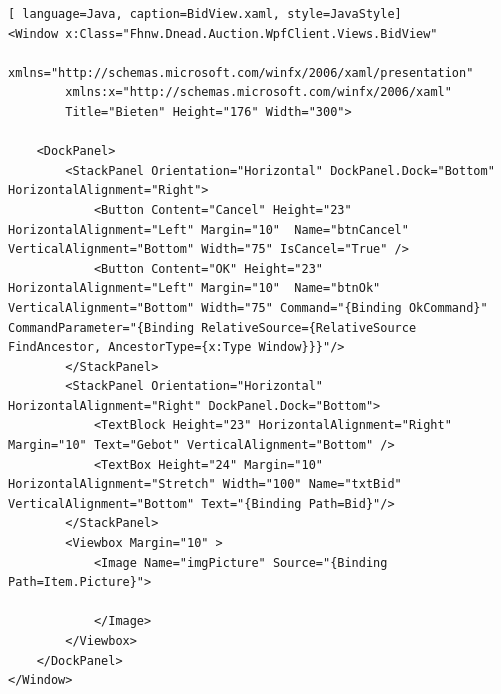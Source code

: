 \documentclass[10pt]{article}
\begin{document}
\begin{lstlisting}[ language=Java, caption=BidView.xaml, style=JavaStyle]
<Window x:Class="Fhnw.Dnead.Auction.WpfClient.Views.BidView"
        xmlns="http://schemas.microsoft.com/winfx/2006/xaml/presentation"
        xmlns:x="http://schemas.microsoft.com/winfx/2006/xaml"
        Title="Bieten" Height="176" Width="300">
   
    <DockPanel>
        <StackPanel Orientation="Horizontal" DockPanel.Dock="Bottom" HorizontalAlignment="Right">
            <Button Content="Cancel" Height="23" HorizontalAlignment="Left" Margin="10"  Name="btnCancel" VerticalAlignment="Bottom" Width="75" IsCancel="True" />
            <Button Content="OK" Height="23" HorizontalAlignment="Left" Margin="10"  Name="btnOk" VerticalAlignment="Bottom" Width="75" Command="{Binding OkCommand}" CommandParameter="{Binding RelativeSource={RelativeSource FindAncestor, AncestorType={x:Type Window}}}"/>
        </StackPanel>
        <StackPanel Orientation="Horizontal" HorizontalAlignment="Right" DockPanel.Dock="Bottom">
            <TextBlock Height="23" HorizontalAlignment="Right" Margin="10" Text="Gebot" VerticalAlignment="Bottom" />
            <TextBox Height="24" Margin="10" HorizontalAlignment="Stretch" Width="100" Name="txtBid" VerticalAlignment="Bottom" Text="{Binding Path=Bid}"/>
        </StackPanel>
        <Viewbox Margin="10" >
            <Image Name="imgPicture" Source="{Binding Path=Item.Picture}">

            </Image>
        </Viewbox>
    </DockPanel>
</Window>
\end{lstlisting}
\end{document}

